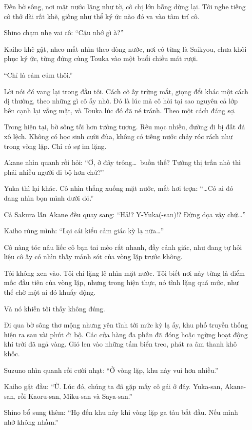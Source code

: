 \documentclass[../main.tex]{subfiles}
\begin{document}
Đến bờ sông, nơi mặt nước lặng như tờ, cô chị lớn bỗng dừng lại. Tôi nghe tiếng cô thở dài rất khẽ, giống như thể ký ức nào đó va vào tâm trí cô.

Shino chạm nhẹ vai cô: ``Cậu nhớ gì à?''

Kaiho khẽ gật, nheo mắt nhìn theo dòng nước, nơi cô từng là Saikyou, chưa khôi phục ký ức, từng đứng cùng Touka vào một buổi chiều mát rượi.

``Chỉ là cảm cúm thôi.''

Lời nói đó vang lại trong đầu tôi. Cách cô ấy trừng mắt, giọng đổi khác một cách dị thường, theo những gì cô ấy nhớ. Đó là lúc mà cô hỏi tại sao nguyên cả lớp bên cạnh lại vắng mặt, và Touka lúc đó đã né tránh. Theo một cách đáng sợ.

Trong hiện tại, bờ sông tối hơn tưởng tượng. Rêu mọc nhiều, đường đi bị đất đá xô lệch. Không có học sinh cười đùa, không có tiếng nước chảy róc rách như trong vòng lặp. Chỉ có sự im lặng.

Akane nhìn quanh rồi hỏi: ``Ơ, ở đây trông\dots\ buồn thế? Tưởng thị trấn nhỏ thì phải nhiều người đi bộ hơn chứ?''

Yuka thì lại khác. Cô nhìn thẳng xuống mặt nước, mắt hơi trợn: ``\dots Có ai đó đang nhìn bọn mình dưới đó.''

Cả Sakura lẫn Akane đều quay sang: ``Hả!? Y-Yuka(-san)!? Đừng dọa vậy chứ\dots''

Kaiho rùng mình: ``Lại cái kiểu cảm giác kỳ lạ nữa\dots''

Cô nàng tóc nâu liếc cô bạn tai mèo rất nhanh, đầy cảnh giác, như đang tự hỏi liệu cô ấy có nhìn thấy mảnh sót của vòng lặp trước không.

Tôi không xen vào. Tôi chỉ lặng lẽ nhìn mặt nước. Tôi biết nơi này từng là điểm mốc đầu tiên của vòng lặp, nhưng trong hiện thực, nó tĩnh lặng quá mức, như thể chờ một ai đó khuấy động.

Và nó khiến tôi thấy không đúng.

Đi qua bờ sông thơ mộng nhưng yên tĩnh tới mức kỳ lạ ấy, khu phố truyền thống hiện ra sau vài phút đi bộ. Các cửa hàng đa phần đã đóng hoặc ngừng hoạt động khi trời đã ngả vàng. Gió len vào những tấm biển treo, phát ra âm thanh khô khốc.

Suzuno nhìn quanh rồi cười nhạt: ``Ở vòng lặp, khu này vui hơn nhiều.''

Kaiho gật đầu: ``Ừ. Lúc đó, chúng ta đã gặp mấy cô gái ở đây. Yuka-san, Akane-san, rồi Kaoru-san, Miku-san và Saya-san.''

Shino bổ sung thêm: ``Họ đến khu này khi vòng lặp ga tàu bắt đầu. Nếu mình nhớ không nhầm.''
\end{document}
